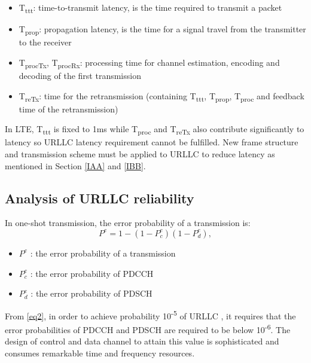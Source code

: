 \documentclass[conference,10pt]{IEEEtran}
\begin{document}
\begin{itemize}
\item T\textsubscript{ttt}: time-to-transmit latency, is the time required to transmit a packet
\item T\textsubscript{prop}: propagation latency, is the time for a signal travel from the transmitter to the receiver
\item T\textsubscript{procTx}, T\textsubscript{procRx}: processing time for channel estimation, encoding and decoding of the first transmission
\item T\textsubscript{reTx}: time for the retransmission (containing T\textsubscript{ttt}, T\textsubscript{prop}, T\textsubscript{proc} and feedback time of the retransmission) 
\end{itemize}

In LTE, T\textsubscript{ttt} is fixed to 1ms while T\textsubscript{proc} and T\textsubscript{reTx} also contribute significantly to latency so URLLC latency requirement cannot be fulfilled. New frame structure and transmission scheme must be applied to URLLC to reduce latency as mentioned in Section \ref{IAA} and \ref{IBB}.  
\subsection{Analysis of URLLC reliability}
In one-shot transmission, the error probability of a transmission is:
\begin{equation}
P^{e} = 1 - (1 - P^{e}_{c})(1 - P^{e}_{d}),\label{eq2}
\end{equation}

\begin{itemize}
    \item $P^{e}$ : the error probability of a transmission
    \item $P^{e}_{c}$ : the error probability of PDCCH 
    \item $P^{e}_{d}$ : the error probability of PDSCH
\end{itemize}

From \eqref{eq2}, in order to achieve probability 10\textsuperscript{-5} of URLLC , it requires that the error probabilities of PDCCH and PDSCH are required to be below 10\textsuperscript{-6}.  The design of control and data channel to attain this value is sophisticated and consumes remarkable time and frequency resources.
\end{document}
